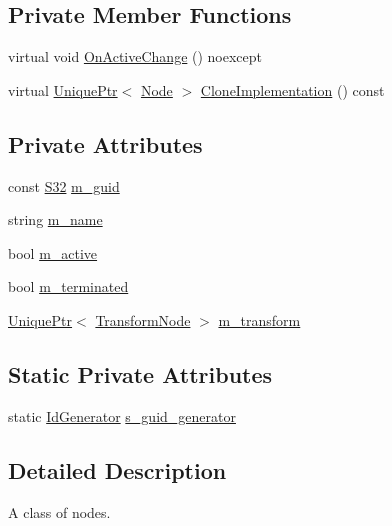 \subsection*{Private Member Functions}
\begin{DoxyCompactItemize}
\item 
virtual void \hyperlink{classmage_1_1_node_a65c1c55801a8e1d5354ac79d0c2fca6e}{On\+Active\+Change} () noexcept
\item 
virtual \hyperlink{namespacemage_a3316d7143a973e37adf1110f2e80ca31}{Unique\+Ptr}$<$ \hyperlink{classmage_1_1_node}{Node} $>$ \hyperlink{classmage_1_1_node_a71a4763bfd4cba5653488b490e61dc8f}{Clone\+Implementation} () const
\end{DoxyCompactItemize}
\subsection*{Private Attributes}
\begin{DoxyCompactItemize}
\item 
const \hyperlink{namespacemage_a642e05c5c83642b6946703615cdbf2da}{S32} \hyperlink{classmage_1_1_node_a4161df417f598841926264710ed7f7fd}{m\+\_\+guid}
\item 
string \hyperlink{classmage_1_1_node_a476cc21fa65cdf9bde0f11fe08b5a707}{m\+\_\+name}
\item 
bool \hyperlink{classmage_1_1_node_ac4dd6c399de8b2a92df92365df7ecdac}{m\+\_\+active}
\item 
bool \hyperlink{classmage_1_1_node_aefb6986428c3dc24540af824a230b61d}{m\+\_\+terminated}
\item 
\hyperlink{namespacemage_a3316d7143a973e37adf1110f2e80ca31}{Unique\+Ptr}$<$ \hyperlink{classmage_1_1_transform_node}{Transform\+Node} $>$ \hyperlink{classmage_1_1_node_a24512023f5f6ec7adad9810e55ec2ab5}{m\+\_\+transform}
\end{DoxyCompactItemize}
\subsection*{Static Private Attributes}
\begin{DoxyCompactItemize}
\item 
static \hyperlink{classmage_1_1_id_generator}{Id\+Generator} \hyperlink{classmage_1_1_node_a923a4e005420dd08eacc94fed50ac2fb}{s\+\_\+guid\+\_\+generator}
\end{DoxyCompactItemize}


\subsection{Detailed Description}
A class of nodes. 

